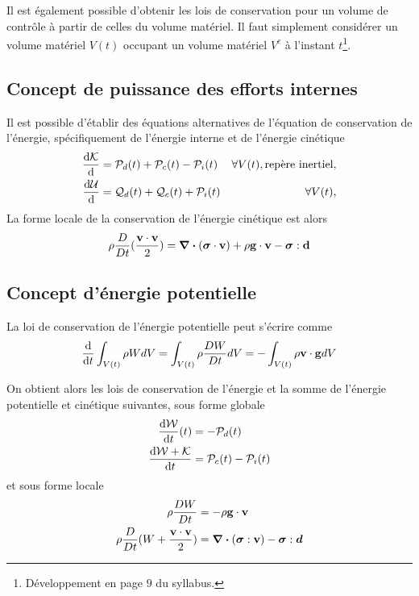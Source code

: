 \documentclass[a4paper,11pt]{report}
\newcommand{\dvm}[2]{\frac{D #1}{D #2}}
\begin{document}
      Il est également possible d'obtenir les lois de conservation pour un volume de contrôle à partir de celles du volume matériel. Il faut simplement considérer un volume matériel $V(t)$ occupant un volume matériel $V^c$ à l'instant $t$\footnote{Développement en page $9$ du syllabus.}.

    \subsection{Concept de puissance des efforts internes}
      Il est possible d'établir des équations alternatives de l'équation de conservation de l'énergie, spécifiquement de l'énergie interne et de l'énergie cinétique
      \begin{align}
        \dv{\mathcal{K}} {}(t) &= \mathcal{P}_d(t) + \mathcal{P}_c(t) - \mathcal{P}_i(t) & \forall V(t), \textrm{repère inertiel},\\
        \dv{\mathcal{U}} {}(t) &= \mathcal{Q}_d(t) + \mathcal{Q}_c(t) + \mathcal{P}_i(t) & \forall V(t), \nonumber
      \end{align}
      La forme locale de la conservation de l'énergie cinétique est alors
      \begin{align}
        \rho \dvm{}{t}(\frac{\vb{v}\cdot \vb{v}}{2}) = \div (\boldsymbol{\sigma} \cdot \vb{v}) + \rho \vb{g} \cdot \vb{v} - \boldsymbol{\sigma} : \vb{d}
      \end{align}

      \subsection{Concept d'énergie potentielle}
        La loi de conservation de l'énergie potentielle peut s'écrire comme
        \begin{align}
          \dv{t}\int_{V(t)} \rho W dV = \int_{V(t)} \rho \dvm{W}{t} dV = - \int_{V(t)} \rho \vb{v} \cdot \vb{g} dV
        \end{align}

        On obtient alors les lois de conservation de l'énergie et la somme de l'énergie potentielle et cinétique suivantes, sous forme globale
        \begin{align}
            \dv{\mathcal{W}}{t} {}(t) &= -\mathcal{P}_d(t)\\
            \dv{\mathcal{W} + \mathcal{K}}{t} &= \mathcal{P}_c(t) - \mathcal{P}_i(t) \nonumber
        \end{align}
        et sous forme locale
        \begin{align}
          \rho \dvm{W}{t} &= -\rho \vb{g} \cdot \vb{v}\\
          \rho \dvm{}{t}(W + \frac{\vb{v} \cdot\vb{v}}{2}) &= \div (\boldsymbol{\sigma} : \vb{v}) - \boldsymbol{\sigma} : \boldsymbol{d}\nonumber
        \end{align}
\end{document}
